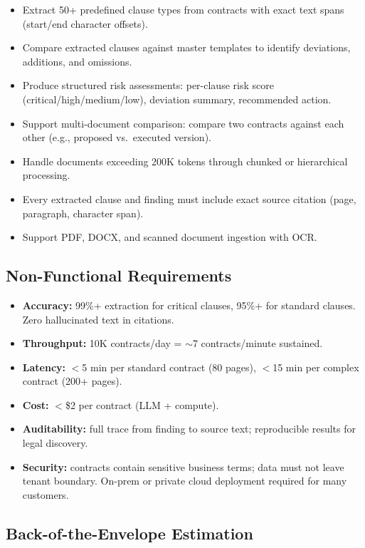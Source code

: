 \begin{itemize}
  \item Extract 50+ predefined clause types from contracts with exact text spans (start/end character offsets).
  \item Compare extracted clauses against master templates to identify deviations, additions, and omissions.
  \item Produce structured risk assessments: per-clause risk score (critical/high/medium/low), deviation summary, recommended action.
  \item Support multi-document comparison: compare two contracts against each other (e.g., proposed vs.\ executed version).
  \item Handle documents exceeding 200K tokens through chunked or hierarchical processing.
  \item Every extracted clause and finding must include exact source citation (page, paragraph, character span).
  \item Support PDF, DOCX, and scanned document ingestion with OCR.
\end{itemize}

\subsection*{Non-Functional Requirements}

\begin{itemize}
  \item \textbf{Accuracy:} 99\%+ extraction for critical clauses, 95\%+ for standard clauses. Zero hallucinated text in citations.
  \item \textbf{Throughput:} 10K contracts/day = $\sim$7 contracts/minute sustained.
  \item \textbf{Latency:} $<$5 min per standard contract (80 pages), $<$15 min per complex contract (200+ pages).
  \item \textbf{Cost:} $<$\$2 per contract (LLM + compute).
  \item \textbf{Auditability:} full trace from finding to source text; reproducible results for legal discovery.
  \item \textbf{Security:} contracts contain sensitive business terms; data must not leave tenant boundary. On-prem or private cloud deployment required for many customers.
\end{itemize}

\subsection*{Back-of-the-Envelope Estimation}

